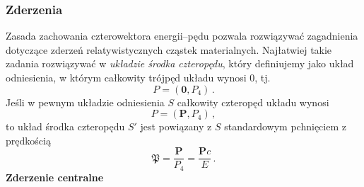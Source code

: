 \documentclass[../main.tex]{subfiles}
\begin{document}
\subsubsection{Zderzenia}
Zasada zachowania czterowektora energii--pędu pozwala rozwiązywać zagadnienia dotyczące zderzeń
relatywistycznych cząstek materialnych. Najłatwiej takie zadania rozwiązywać w \textit{układzie
środka czteropędu}, który definiujemy jako układ odniesienia, w którym całkowity trójpęd układu
wynosi \(0\), tj.
\begin{equation*}
    P=(\mathbf{0},P_4)\,.
\end{equation*}
Jeśli w pewnym układzie odniesienia \(S\) całkowity czteropęd układu wynosi
\begin{equation*}
    P=(\mathbf{P},P_4)\,,
\end{equation*}
to układ środka czteropędu \(S'\) jest powiązany z \(S\) standardowym pchnięciem z prędkością
\begin{equation*}
    \boldsymbol{\mathfrak{P}}=\frac{\mathbf{P}}{P_4}=\frac{\mathbf{P}c}{E}\,.
\end{equation*}
\textbf{Zderzenie centralne}
\medskip
\end{document}
